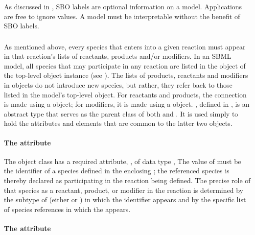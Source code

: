 As discussed in , SBO labels are optional
information on a model.  Applications are free to ignore
 values.  A model must be interpretable without the
benefit of SBO labels.


\subsubsection{}
\label{subsec:simplespeciesreference}

As mentioned above, every species that enters into a given
reaction must appear in that reaction's lists of reactants,
products and/or modifiers.  In an SBML model, all species that may
participate in any reaction are listed in the \ListOfSpecies
object of the top-level \Model object instance (see
).  The lists of products, reactants and
modifiers in \Reaction objects do not introduce new species, but
rather, they refer back to those listed in the model's top-level
\ListOfSpecies object.  For reactants and products, the connection
is made using a \SpeciesReference object; for modifiers, it is
made using a \ModifierSpeciesReference object.
\SimpleSpeciesReference, defined in , is
an abstract type that serves as the parent class of both
\SpeciesReference and \ModifierSpeciesReference.  It is used
simply to hold the attributes and elements that are common to the
latter two objects.


\paragraph{The  attribute}

The \SimpleSpeciesReference object class has a required attribute,
, of data type ,
  The value of  must be
the identifier of a species defined in the enclosing \Model; the
referenced species is thereby declared as participating in the
reaction being defined.  The precise role of that species as a
reactant, product, or modifier in the reaction is determined by
the subtype of \SimpleSpeciesReference (\ie either
\SpeciesReference or \ModifierSpeciesReference) in which the
identifier appears and by the specific list of species references
in which the \SpeciesReference appears.


\paragraph{The  attribute}
\label{sec:simplespeciesreference-sboterm}


